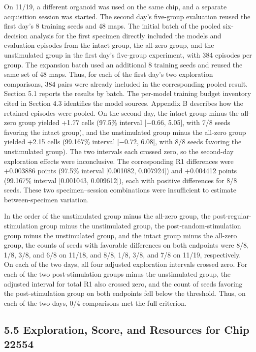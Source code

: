 \documentclass{article}
\begin{document}
On 11/19, a different organoid was used on the same chip, and a separate acquisition session was started. The second day's five-group evaluation reused the first day's 8 training seeds and 48 maps. The initial batch of the pooled six-decision analysis for the first specimen directly included the models and evaluation episodes from the intact group, the all-zero group, and the unstimulated group in the first day's five-group experiment, with 384 episodes per group. The expansion batch used an additional 8 training seeds and reused the same set of 48 maps. Thus, for each of the first day's two exploration comparisons, 384 pairs were already included in the corresponding pooled result. Section 5.1 reports the results by batch. The per-model training budget inventory cited in Section 4.3 identifies the model sources. Appendix B describes how the retained episodes were pooled. On the second day, the intact group minus the all-zero group yielded +1.77 cells (97.5\% interval [\ensuremath{-}0.66, 5.05], with 7/8 seeds favoring the intact group), and the unstimulated group minus the all-zero group yielded +2.15 cells (99.167\% interval [\ensuremath{-}0.72, 6.08], with 8/8 seeds favoring the unstimulated group). The two intervals each crossed zero, so the second-day exploration effects were inconclusive. The corresponding R1 differences were +0.003886 points (97.5\% interval [0.001082, 0.007924]) and +0.004412 points (99.167\% interval [0.001043, 0.009612]), each with positive differences for 8/8 seeds. These two specimen--session combinations were insufficient to estimate between-specimen variation.


In the order of the unstimulated group minus the all-zero group, the post-regular-stimulation group minus the unstimulated group, the post-random-stimulation group minus the unstimulated group, and the intact group minus the all-zero group, the counts of seeds with favorable differences on both endpoints were 8/8, 1/8, 3/8, and 6/8 on 11/18, and 8/8, 1/8, 3/8, and 7/8 on 11/19, respectively. On each of the two days, all four adjusted exploration intervals crossed zero. For each of the two post-stimulation groups minus the unstimulated group, the adjusted interval for total R1 also crossed zero, and the count of seeds favoring the post-stimulation group on both endpoints fell below the threshold. Thus, on each of the two days, 0/4 comparisons met the full criterion.


\subsection*{5.5 Exploration, Score, and Resources for Chip 22554}
\end{document}
